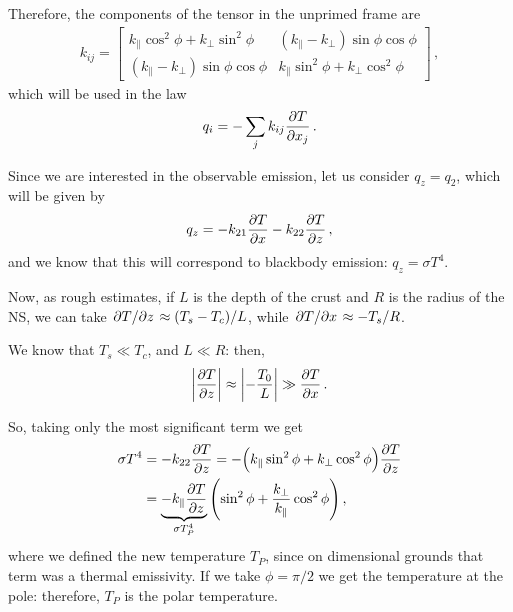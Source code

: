 \documentclass[main.tex]{subfiles}
\begin{document}


Therefore, the components of the tensor in the unprimed frame are 
%
\begin{align}
k_{ij} = \left[\begin{array}{cc}
k_\parallel \cos^2 \phi + k_\perp \sin^2\phi  & (k_\parallel - k_\perp) \sin \phi \cos \phi  \\ 
(k_\parallel - k_\perp) \sin \phi \cos \phi  & 
k_\parallel \sin^2 \phi + k_\perp \cos^2\phi
\end{array}\right]
\,,
\end{align}
%
which will be used in the law 
%
\begin{align}
q_i = - \sum _{j} k_{ij } \pdv{T}{x _j}
\,.
\end{align}

Since we are interested in the observable emission, 
let us consider \(q_z = q_2\), which will be given by 
%
\begin{align}
q_z = - k_{21} \pdv{T}{x} - k_{22} \pdv{T}{z}
\,,
\end{align}
%
and we know that this will correspond to blackbody emission: \(q_z = \sigma T^{4}\).

Now, as rough estimates, if \(L\) is the depth of the crust and \(R\) is the radius of the NS, we can take \(\pdv*{T}{z} \approx (T_s - T_c ) / L\), while \(\pdv*{T}{x} \approx - T_s/R\).

We know that \(T_s \ll T_c \), and \(L \ll R\): then, 
%
\begin{align}
\abs{ \pdv{T}{z}} \approx \abs{- \frac{T_0}{L} } \gg \pdv{T}{x}
\,.
\end{align}

So, taking only the most significant term we get 
%
\begin{align}
\sigma T^{4} &= - k_{22} \pdv{T}{z} = - \qty(
k_\parallel \sin^2 \phi + k_\perp \cos^2\phi) \pdv{T}{z}   \\
&= \underbrace{- k_\parallel \pdv{T}{z}}_{\sigma T_P^{4}} \qty( \sin^2 \phi + \frac{k_\perp}{k_\parallel} \cos^2 \phi )
\,,
\end{align}
%
where we defined the new temperature \(T_P\), since on dimensional grounds that term was a thermal emissivity. If we take \(\phi = \pi /2\) we get the temperature at the pole: therefore, \(T_P\) is the polar temperature.
\end{document}
